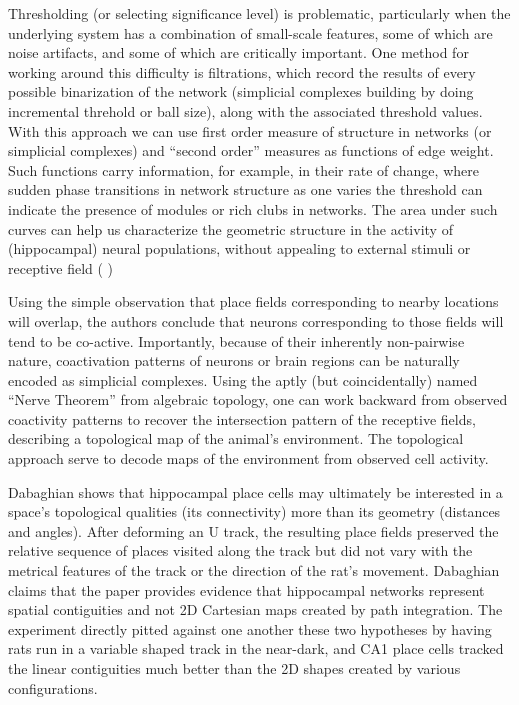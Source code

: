 \documentclass[onecollarge,runningheads]{svjour2}
\begin{document}
Thresholding (or selecting significance level) is problematic, particularly when the underlying system has a combination of small-scale features, some of which are noise artifacts, and some of which are critically important.  %
One method for working around this difficulty is filtrations, which record the results of every possible binarization of the network (simplicial complexes building by doing incremental threhold or ball size), along with the associated threshold values. With this approach we can use first order measure of structure in networks (or simplicial complexes) and  “second order” measures as functions of edge weight. Such functions carry information, for example, in their rate of change, where sudden phase transitions in network structure as one varies the threshold can indicate the presence of modules or rich clubs in networks. The area under such curves can help us characterize the geometric structure in the activity of (hippocampal) neural populations, without appealing to external stimuli or receptive field ( \citep{giusti2015clique})

Using the simple observation that place fields corresponding to nearby locations will overlap, the authors conclude that neurons corresponding to those fields will tend to be co-active. Importantly, because of their inherently non-pairwise nature, coactivation patterns of neurons or brain regions can be naturally encoded as simplicial complexes. 
Using the aptly (but coincidentally) named “Nerve Theorem” from algebraic topology, one can work backward from observed coactivity patterns to recover the intersection pattern of the receptive fields, describing a topological map of the animal’s environment.
The topological approach serve to decode maps of the environment from observed cell activity.

Dabaghian \citep{dabaghian2014reconceiving} shows that hippocampal place cells may ultimately be interested in a space's topological qualities (its connectivity) more than its geometry (distances and angles). After deforming an U track, the resulting place fields preserved the relative sequence of places visited along the track but did not vary with the metrical features of the track or the direction of the rat's movement.
Dabaghian claims that the paper provides evidence that hippocampal networks represent spatial contiguities and not 2D Cartesian maps created by path integration. The experiment directly pitted against one another these two hypotheses by having rats run in a variable shaped track in the near-dark, and CA1 place cells tracked the linear contiguities much better than the 2D shapes created by various configurations. 
\end{document}
